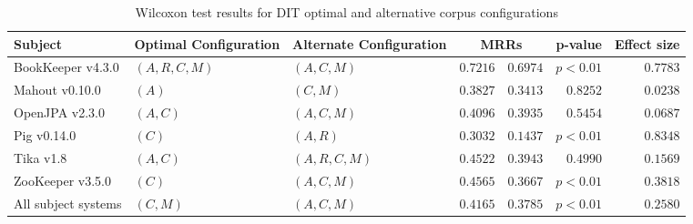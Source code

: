\begin{landscape}
\begin{table}
\begin{spacing}{1.2}
\centering
\caption{Wilcoxon test results for DIT optimal and alternative corpus configurations}
\label{table:combo-dit-corpus-sweep-wilcox}
\begin{tabular}{lllrrrr}
\toprule
                      Subject & Optimal Configuration & Alternate Configuration & \multicolumn{2}{c}{MRRs}  &  p-value & Effect size \\
\midrule
            BookKeeper v4.3.0 &        $(A, R, C, M)$ &             $(A, C, M)$ &    $0.7216$ &      $0.6974$ & $p<0.01$ &    $0.7783$ \\
               Mahout v0.10.0 &                 $(A)$ &                $(C, M)$ &    $0.3827$ &      $0.3413$ & $0.8252$ &    $0.0238$ \\
               OpenJPA v2.3.0 &              $(A, C)$ &             $(A, C, M)$ &    $0.4096$ &      $0.3935$ & $0.5454$ &    $0.0687$ \\
                  Pig v0.14.0 &                 $(C)$ &                $(A, R)$ &    $0.3032$ &      $0.1437$ & $p<0.01$ &    $0.8348$ \\
                    Tika v1.8 &              $(A, C)$ &          $(A, R, C, M)$ &    $0.4522$ &      $0.3943$ & $0.4990$ &    $0.1569$ \\
             ZooKeeper v3.5.0 &                 $(C)$ &             $(A, C, M)$ &    $0.4565$ &      $0.3667$ & $p<0.01$ &    $0.3818$ \\
 \midrule
All subject systems &              $(C, M)$ &             $(A, C, M)$ &    $0.4165$ &      $0.3785$ & $p<0.01$ &    $0.2580$ \\
\bottomrule
\end{tabular}

\end{spacing}
\end{table}

\end{landscape}
